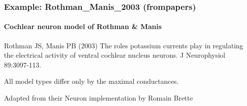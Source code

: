 \documentclass[letterpaper,10pt,english]{manual}
\begin{document}
\hypertarget{index-32}{}\subsubsection{Example: Rothman\_Manis\_2003 (frompapers)}


\paragraph{Cochlear neuron model of Rothman \& Manis}

Rothman JS, Manis PB (2003) The roles potassium currents play in
regulating the electrical activity of ventral cochlear nucleus neurons.
J Neurophysiol 89:3097-113.

All model types differ only by the maximal conductances.

Adapted from their Neuron implementation by Romain Brette
\end{document}
